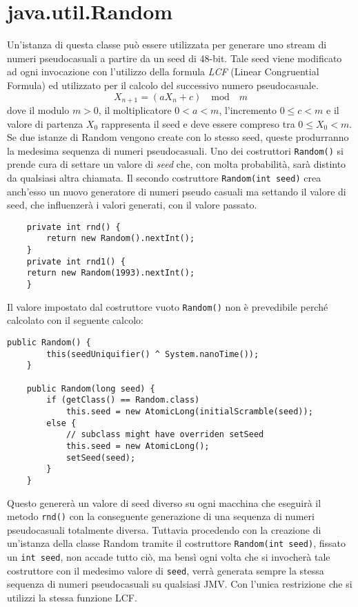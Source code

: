 	\section{java.util.Random}
	\label{java.ulit.random}
		Un'istanza di questa classe può essere utilizzata per generare uno stream di numeri pseudocasuali a partire da un seed di 48-bit. Tale seed viene modificato ad ogni invocazione con l'utilizzo della formula \textit{LCF} (Linear Congruential Formula) ed utilizzato per il calcolo del successivo numero pseudocasuale. 
		\[ X_{n+1} = (aX_n + c) \quad \text{mod} \quad m\]
		dove il modulo $m > 0$, il moltiplicatore $0 < a < m$, l'incremento $0 \leq c < m$ e il valore di partenza $X_0$ rappresenta il seed e deve essere compreso tra $0 \leq X_0 < m$.
		Se due istanze di Random vengono create con lo stesso seed, queste produrranno la medesima sequenza di numeri pseudocasuali. Uno dei costruttori \lstinline|Random()| si prende cura di settare un valore di \textit{seed} che, con molta probabilità, sarà distinto da qualsiasi altra chiamata. Il secondo costruttore \lstinline|Random(int seed)| crea anch'esso un nuovo generatore di numeri pseudo casuali ma settando il valore di seed, che influenzerà i valori generati, con il valore passato. 
		\begin{lstlisting}
	private int rnd() {
		return new Random().nextInt(); 
	}
	private int rnd1() {
	return new Random(1993).nextInt(); 
	}  
		\end{lstlisting}
		Il valore impostato dal costruttore vuoto \lstinline|Random()| non è prevedibile perché calcolato con il seguente calcolo:
		\begin{lstlisting}[numbers=none,frame=none]
	public Random() {
		this(seedUniquifier() ^ System.nanoTime());
	}
	
	public Random(long seed) {
		if (getClass() == Random.class)
			this.seed = new AtomicLong(initialScramble(seed));
		else {
			// subclass might have overriden setSeed
			this.seed = new AtomicLong();
			setSeed(seed);
		}
	}
		\end{lstlisting}
		Questo genererà un valore di seed diverso su ogni macchina che eseguirà il metodo \lstinline|rnd()| con la conseguente generazione di una sequenza di numeri pseudocasuali totalmente diversa. Tuttavia procedendo con la creazione di un'istanza della classe Random tramite il costruttore \lstinline|Random(int seed)|, fissato un \lstinline|int seed|, non accade tutto ciò, ma bensì ogni volta che si invocherà tale costruttore con il medesimo valore di \lstinline|seed|, verrà generata sempre la stessa sequenza di numeri pseudocasuali su qualsiasi JMV. Con l'unica restrizione che si utilizzi la stessa funzione LCF. 
